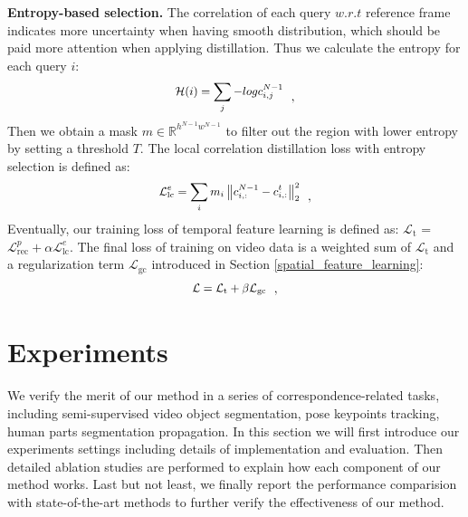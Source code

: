 \documentclass{article}
\begin{document}
\textbf{Entropy-based selection.} The correlation of each query $w.r.t$ reference frame indicates more uncertainty when having smooth distribution, which should be paid more attention when applying distillation. Thus we calculate the entropy for each query $i$:
\begin{equation}\label{eq:pyramid reconstruction loss}
  \small
  \begin{aligned}
    \mathcal{H}(i)=\sum_j-log c^{N-1}_{i,j}
  \end{aligned}~~,
\end{equation}
Then we obtain a mask $m \in \mathbb{R}^{h^{N-1}w^{N-1}}$ to filter out the region with lower entropy by setting a threshold $T$. The local correlation distillation loss with entropy selection is defined as:
\begin{equation}\label{eq:reconstruction loss}
  \small
  \begin{aligned}
    \mathcal{L}^e_{\mathrm{lc}}=\sum_im_i\left\|c_{i,:}^{N-1}-c_{i,:}^t\right\|^2_{2}
  \end{aligned}~~,
\end{equation}
Eventually, our training loss of temporal feature learning is defined as: $\mathcal{L}_\mathrm{t}$ =  $\mathcal{L}^p_{\mathrm{rec}} + \alpha  \mathcal{L}^e_{\mathrm{lc}}$. The final loss of training on video data is a weighted sum of  $\mathcal{L}_\mathrm{t}$ and a regularization term $\mathcal{L}_\mathrm{gc}$ introduced in Section \ref{spatial_feature_learning}:
\begin{equation}\label{eq:final loss}
  \small
  \begin{aligned}
    \mathcal{L} = \mathcal{L}_{\mathrm{t}}  + \beta  \mathcal{L}_{\mathrm{gc}}
  \end{aligned}~~,
\end{equation}


\section{Experiments}
We verify the merit of our method in a series of correspondence-related tasks, including semi-supervised video object segmentation, pose keypoints tracking, human parts segmentation propagation. In this section we will first introduce our experiments settings including details of implementation  and evaluation. Then detailed ablation studies are performed to  explain how each component of our method works. Last but not least, we finally report the performance comparision with state-of-the-art methods to further verify the effectiveness of our method.
\end{document}
